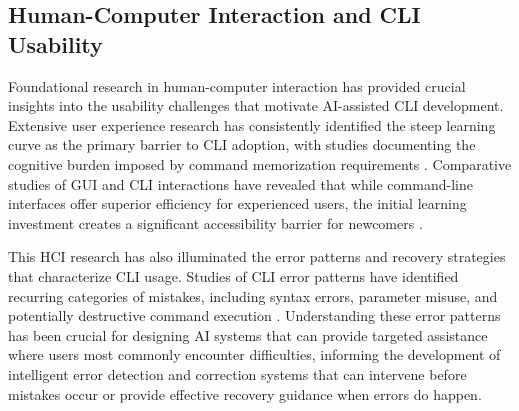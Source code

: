 \subsection{Human-Computer Interaction and CLI Usability}

Foundational research in human-computer interaction has provided crucial insights into the usability challenges that motivate AI-assisted CLI development. Extensive user experience research has consistently identified the steep learning curve as the primary barrier to CLI adoption, with studies documenting the cognitive burden imposed by command memorization requirements \cite{margono1987}. Comparative studies of GUI and CLI interactions have revealed that while command-line interfaces offer superior efficiency for experienced users, the initial learning investment creates a significant accessibility barrier for newcomers \cite{card1983}.

This HCI research has also illuminated the error patterns and recovery strategies that characterize CLI usage. Studies of CLI error patterns have identified recurring categories of mistakes, including syntax errors, parameter misuse, and potentially destructive command execution \cite{margono1987}. Understanding these error patterns has been crucial for designing AI systems that can provide targeted assistance where users most commonly encounter difficulties, informing the development of intelligent error detection and correction systems that can intervene before mistakes occur or provide effective recovery guidance when errors do happen.
